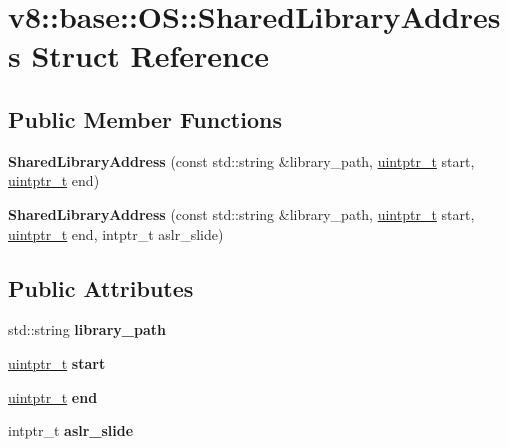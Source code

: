 \hypertarget{structv8_1_1base_1_1OS_1_1SharedLibraryAddress}{}\section{v8\+:\+:base\+:\+:OS\+:\+:Shared\+Library\+Address Struct Reference}
\label{structv8_1_1base_1_1OS_1_1SharedLibraryAddress}
\subsection*{Public Member Functions}
\begin{DoxyCompactItemize}
\item 
\mbox{\label{structv8_1_1base_1_1OS_1_1SharedLibraryAddress_a27939e44006c9c16f45d4574a3f34149}} 
{\bfseries Shared\+Library\+Address} (const std\+::string \&library\+\_\+path, \mbox{\hyperlink{classuintptr__t}{uintptr\+\_\+t}} start, \mbox{\hyperlink{classuintptr__t}{uintptr\+\_\+t}} end)
\item 
\mbox{\label{structv8_1_1base_1_1OS_1_1SharedLibraryAddress_ae96323e7d772ccb7d8ed130f1ac6d88f}} 
{\bfseries Shared\+Library\+Address} (const std\+::string \&library\+\_\+path, \mbox{\hyperlink{classuintptr__t}{uintptr\+\_\+t}} start, \mbox{\hyperlink{classuintptr__t}{uintptr\+\_\+t}} end, intptr\+\_\+t aslr\+\_\+slide)
\end{DoxyCompactItemize}
\subsection*{Public Attributes}
\begin{DoxyCompactItemize}
\item 
\mbox{\label{structv8_1_1base_1_1OS_1_1SharedLibraryAddress_a17d35a93f53f73def82274159e599ac1}} 
std\+::string {\bfseries library\+\_\+path}
\item 
\mbox{\label{structv8_1_1base_1_1OS_1_1SharedLibraryAddress_a2d00ba0f4595c5fa36a95fbaab8e3c85}} 
\mbox{\hyperlink{classuintptr__t}{uintptr\+\_\+t}} {\bfseries start}
\item 
\mbox{\label{structv8_1_1base_1_1OS_1_1SharedLibraryAddress_afe93a457c1f3c7af9eda3aad907fa3ab}} 
\mbox{\hyperlink{classuintptr__t}{uintptr\+\_\+t}} {\bfseries end}
\item 
\mbox{\label{structv8_1_1base_1_1OS_1_1SharedLibraryAddress_a471c046aae63463b92b4acbd7ce30dd4}} 
intptr\+\_\+t {\bfseries aslr\+\_\+slide}
\end{DoxyCompactItemize}


